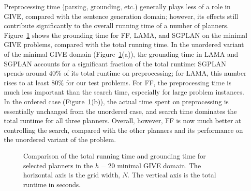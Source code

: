 Preprocessing time (parsing, grounding, etc.) generally plays less of a role in
GIVE, compared with the sentence generation domain; however, its effects still
contribute significantly to the overall running time of a number of planners.
Figure~\ref{fig:give-minimal-grounding} shows the grounding time for FF, LAMA,
and SGPLAN on the minimal GIVE problems, compared with the total running time.
In the unordered variant of the minimal GIVE domain
(Figure~\ref{fig:give-minimal-grounding}(a)), the grounding time in LAMA and
SGPLAN accounts for a significant fraction of the total runtime: SGPLAN spends
around 40\% of its total runtime on preprocessing; for LAMA, this number
rises to at least 80\% for our test problems. For FF, the preprocessing time is
much less important than the search time, especially for large problem
instances. In the ordered case (Figure~\ref{fig:give-minimal-grounding}(b)), the
actual time spent on preprocessing is essentially unchanged from the unordered
case, and search time dominates the total runtime for all three planners.
Overall, however, FF is now much better at controlling the search, compared with
the other planners and its performance on the unordered variant of the problem.


\begin{figure}[t]
  \caption{Comparison of the total running time and grounding time for selected
  planners in the $h=20$ minimal GIVE domain. The horizontal axis is the grid
  width, $N$. The vertical axis is the total runtime in seconds.}
  \label{fig:give-minimal-grounding}
\end{figure}



